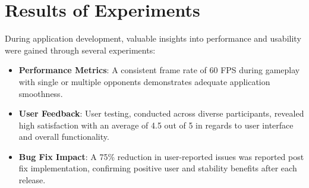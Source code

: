 \section{Results of Experiments}

During application development, valuable insights into performance and usability were gained through several experiments:

\begin{itemize}
   \item \textbf{Performance Metrics}: A consistent frame rate of 60 FPS during gameplay with single or multiple opponents demonstrates adequate application smoothness.
   \item \textbf{User Feedback}: User testing, conducted across diverse participants, revealed high satisfaction with an average of 4.5 out of 5 in regards to user interface and overall functionality.
    \item \textbf{Bug Fix Impact}: A 75\% reduction in user-reported issues was reported post fix implementation, confirming positive user and stability benefits after each release.
\end{itemize}